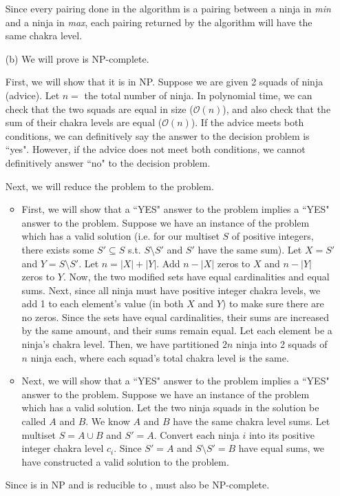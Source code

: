 \documentclass{article}
\newcommand{\bigO}{\mathcal{O}}
\begin{document}
\begin{enumerate}
    Since every pairing done in the algorithm is a pairing between a ninja in \textit{min} and a ninja in \textit{max}, each pairing returned by the algorithm will have the same chakra level.
    
    \item[(b)] We will prove {} is NP-complete. 

    First, we will show that it is in NP. Suppose we are given 2 squads of ninja (advice). Let $n=$ the total number of ninja. In polynomial time, we can check that the two squads are equal in size ($\bigO(n)$), and also check that the sum of their chakra levels are equal ($\bigO(n)$). If the advice meets both conditions, we can definitively say the answer to the decision problem is ``yes". However, if the advice does not meet both conditions, we cannot definitively answer ``no" to the decision problem.

    Next, we will reduce the {} problem to the {} problem.
    \begin{itemize}
        \item First, we will show that a ``YES" answer to the {} problem implies a ``YES" answer to the {} problem. Suppose we have an instance of the {} problem which has a valid solution (i.e. for our multiset $S$ of positive integers, there exists some $S' \subseteq S$ s.t. $S\setminus S'$ and $S'$ have the same sum). Let $X=S'$ and $Y=S \setminus S'$. Let $n=|X|+|Y|$. Add $n-|X|$ zeros to $X$ and $n-|Y|$ zeros to $Y$. Now, the two modified sets have equal cardinalities and equal sums. Next, since all ninja must have positive integer chakra levels, we add 1 to each element's value (in both $X$ and $Y$) to make sure there are no zeros. Since the sets have equal cardinalities, their sums are increased by the same amount, and their sums remain equal. Let each element be a ninja's chakra level. Then, we have partitioned $2n$ ninja into 2 squads of $n$ ninja each, where each squad's total chakra level is the same.
        \item Next, we will show that a ``YES" answer to the {} problem implies a ``YES" answer to the {} problem. Suppose we have an instance of the {} problem which has a valid solution. Let the two ninja squads in the solution be called $A$ and $B$. We know $A$ and $B$ have the same chakra level sums. Let multiset $S = A \cup B$ and $S'=A$. Convert each ninja $i$ into its positive integer chakra level $c_i$. Since $S'=A$ and $S \setminus S'=B$ have equal sums, we have constructed a valid solution to the {} problem.
    \end{itemize} 
    Since {} is in NP and {} is reducible to {}, {} must also be NP-complete.

\end{enumerate}
\end{document}

